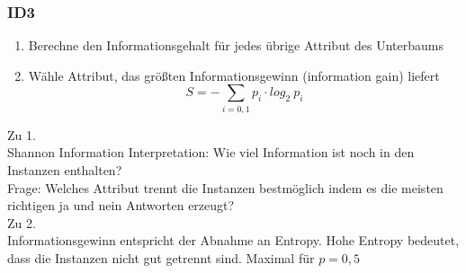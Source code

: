 	\subsubsection{ID3}
	\begin{enumerate}
		\item Berechne den Informationsgehalt für jedes übrige Attribut des Unterbaums
		\item Wähle Attribut, das größten Informationsgewinn (information gain) liefert
		\begin{equation*}
			S=-\sum_{i=0,1}p_i\cdot log_2~p_i
		\end{equation*}
	\end{enumerate}
	Zu 1.\\[5pt]
	Shannon Information Interpretation: Wie viel Information ist noch in den Instanzen enthalten?\\
	Frage: Welches Attribut trennt die Instanzen bestmöglich indem es die meisten richtigen ja und nein Antworten erzeugt?\\[5pt]
	Zu 2.\\[5pt]
	Informationsgewinn entspricht der Abnahme an Entropy. Hohe Entropy bedeutet, dass die Instanzen nicht gut getrennt sind. Maximal für $p=0,5$
